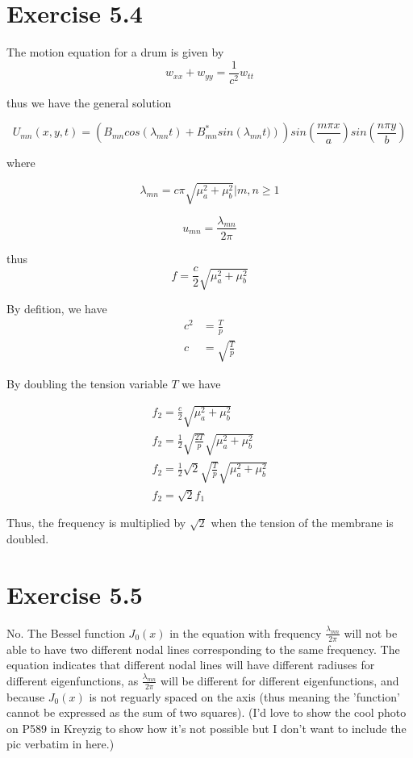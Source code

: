 \documentclass{article}
\begin{document}
\section*{Exercise 5.4}
The motion equation for a drum is given by
$$
w_{xx}+w_{yy}=\frac{1}{c^2}w_{tt}
$$

thus we have the general solution

$$
U_{mn}(x,y,t) = \left(B_{mn}cos(\lambda_{mn}t)+B^{*}_{mn}sin\left(\lambda_{mn}t)\right)\right)sin\left(\frac{m \pi x}{a}\right)sin\left(\frac{n \pi y}{b}\right)
$$

where

$$
\lambda_{mn} = c\pi \sqrt{\mu_a^2 + \mu_b^2}\Bigr| m,n \geq 1
$$

$$
u_{mn} = \frac{\lambda_{mn}}{2\pi }
$$

thus
$$
f = \frac{c}{2} \sqrt{\mu_a^2 + \mu_b^2}
$$

By defition, we have 
\begin{align*}
c^2 &= \frac{T}{p}\\
c &= \sqrt{\frac{T}{p}}
\end{align*}

By doubling the tension variable $T$ we have

\begin{align*}
f_2 = \frac{c}{2} \sqrt{\mu_a^2 + \mu_b^2} \\
f_2 = \frac{1}{2} \sqrt{\frac{2T}{p}}\sqrt{\mu_a^2 + \mu_b^2} \\
f_2 = \frac{1}{2} \sqrt{2} \sqrt{\frac{T}{p}}\sqrt{\mu_a^2 + \mu_b^2} \\
f_2 = \sqrt{2} f_1
\end{align*}

Thus, the frequency is multiplied by $\sqrt{2}$ when the tension of the membrane is doubled.

\section*{Exercise 5.5}

No. The Bessel function $J_0(x)$ in the equation with frequency $\frac{\lambda_{mn}}{2\pi}$ will not be able to have two different nodal lines corresponding to the same frequency.
The equation indicates that different nodal lines will have different radiuses for different eigenfunctions, as $\frac{\lambda_{mn}}{2\pi}$ will be different for different eigenfunctions, and because $J_0(x)$ is not reguarly spaced on the axis (thus meaning the 'function' cannot be expressed as the sum of two squares). (I'd love to show the cool photo on P589 in Kreyzig to show how it's not possible but I don't want to include the pic verbatim in here.)
\end{document}

